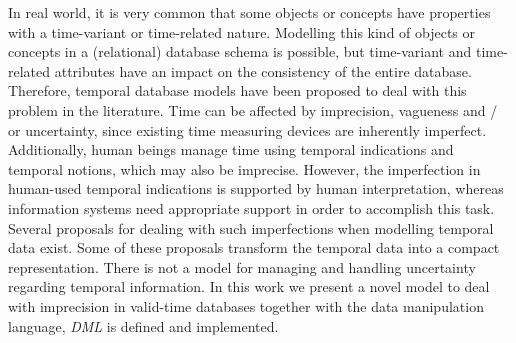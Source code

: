 %
%
In real world, it is very common that some objects or concepts have properties with a time-variant or time-related nature. Modelling this kind of objects or concepts in a (relational) database schema is possible, but time-variant and time-related attributes have an impact on the consistency of the entire database. Therefore, temporal database models have been proposed to deal with this problem in the literature. Time can be affected by imprecision, vagueness and / or  uncertainty, since existing time measuring devices are inherently imperfect. Additionally, human beings manage time using temporal indications and temporal notions, which may also be imprecise. However, the imperfection in human-used temporal indications is supported by human interpretation, whereas information systems need appropriate support in order to accomplish this task. Several proposals for dealing with such imperfections when modelling temporal data exist. Some of these proposals transform the temporal data into a compact representation. There is not a model for managing and handling uncertainty regarding temporal information.
In this work we present a novel model to deal with imprecision in valid-time databases together with the data manipulation language, \emph{DML} is defined and implemented.
